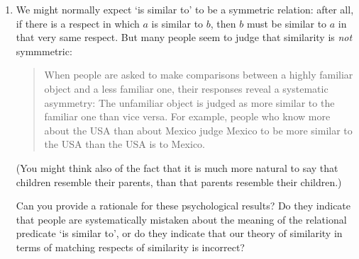 {\begin{enumerate}
	







\item	We might normally expect `is similar to' to be a symmetric relation: after all, if there is a respect in which $a$ is similar to $b$, then $b$ must be similar to $a$ in that very same respect. But many people seem to judge that similarity is \emph{not} symmmetric: \begin{quote}
		When people are asked to make comparisons between a highly familiar object and a less familiar one, their responses reveal a systematic asymmetry: The unfamiliar object is judged as more similar to the familiar one than vice versa. For example, people who know more about the USA than about Mexico judge Mexico to be more similar to the USA than the USA is to Mexico. \citep[520]{kunsocco}
	\end{quote} (You might think also of the fact that it is much more natural to say that children resemble their parents, than that parents resemble their children.)

	Can you provide a rationale for these psychological results? Do they indicate that people are systematically mistaken about the meaning of the relational predicate `is similar to', or do they indicate that our theory of similarity in terms of matching respects of similarity is incorrect?

\end{enumerate}

}



	








